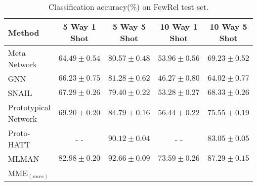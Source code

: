 \begin{table*}[ht]
\centering
\small
\begin{tabular}{|l|c|c|c|c|}
\hline \textbf{Method} & \textbf{5 Way 1 Shot} & \textbf{5 Way 5 Shot} & \textbf{10 Way 1 Shot} & \textbf{10 Way 5 Shot}\\ \hline
Meta Network & $64.49 \pm 0.54$ & $80.57 \pm 0.48$ & $53.96 \pm 0.56$ & $69.23 \pm 0.52$ \\ 
GNN & $66.23 \pm 0.75$ & $81.28 \pm 0.62$ & $46.27 \pm 0.80$ & $64.02 \pm 0.77$ \\ 
SNAIL & $67.29 \pm 0.26$ & $79.40 \pm 0.22$ & $53.28 \pm 0.27$ & $68.33 \pm 0.26$ \\ 
Prototypical Network & $69.20 \pm 0.20$ & $84.79 \pm 0.16$ & $56.44 \pm 0.22$ & $75.55 \pm 0.19$ \\ 
Proto-HATT & - - & $90.12 \pm 0.04$ & - - & $83.05 \pm 0.05$ \\ 
MLMAN & $82.98 \pm 0.20$ & $92.66 \pm 0.09$ & $73.59 \pm 0.26$ & $87.29 \pm 0.15$  \\  \hline
MME$_(ours)$& & & & \\ \hline
\end{tabular}
\caption{Classification accuracy(\%) on FewRel test set.}
\label{FewReltest}
\end{table*}


